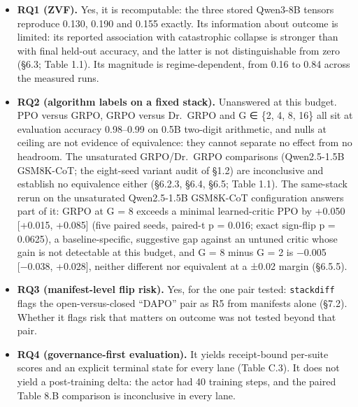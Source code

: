 \documentclass[12pt,a4paper]{report}
\providecommand{\tightlist}{%
  \setlength{\itemsep}{0pt}\setlength{\parskip}{0pt}}
\begin{document}
\begin{itemize}
\tightlist
\item
  \textbf{RQ1 (ZVF).} Yes, it is recomputable: the three stored Qwen3-8B
  tensors reproduce 0.130, 0.190 and 0.155 exactly. Its information
  about outcome is limited: its reported association with catastrophic
  collapse is stronger than with final held-out accuracy, and the latter
  is not distinguishable from zero (§6.3; Table 1.1). Its magnitude is
  regime-dependent, from 0.16 to 0.84 across the measured runs.
\item
  \textbf{RQ2 (algorithm labels on a fixed stack).} Unanswered at this
  budget. PPO versus GRPO, GRPO versus Dr.~GRPO and G ∈ \{2, 4, 8, 16\}
  all sit at evaluation accuracy 0.98--0.99 on 0.5B two-digit
  arithmetic, and nulls at ceiling are not evidence of equivalence: they
  cannot separate no effect from no headroom. The unsaturated
  GRPO/Dr.~GRPO comparisons (Qwen2.5-1.5B GSM8K-CoT; the eight-seed
  variant audit of §1.2) are inconclusive and establish no equivalence
  either (§6.2.3, §6.4, §6.5; Table 1.1). The same-stack rerun on the
  unsaturated Qwen2.5-1.5B GSM8K-CoT configuration answers part of it:
  GRPO at G = 8 exceeds a minimal learned-critic PPO by +0.050
  {[}+0.015, +0.085{]} (five paired seeds, paired-t p = 0.016; exact
  sign-flip p = 0.0625), a baseline-specific, suggestive gap against an
  untuned critic whose gain is not detectable at this budget, and G = 8
  minus G = 2 is −0.005 {[}−0.038, +0.028{]}, neither different nor
  equivalent at a ±0.02 margin (§6.5.5).
\item
  \textbf{RQ3 (manifest-level flip risk).} Yes, for the one pair tested:
  \texttt{stackdiff} flags the open-versus-closed ``DAPO'' pair as R5
  from manifests alone (§7.2). Whether it flags risk that matters on
  outcome was not tested beyond that pair.
\item
  \textbf{RQ4 (governance-first evaluation).} It yields receipt-bound
  per-suite scores and an explicit terminal state for every lane (Table
  C.3). It does not yield a post-training delta: the actor had 40
  training steps, and the paired Table 8.B comparison is inconclusive in
  every lane.
\end{itemize}
\end{document}
